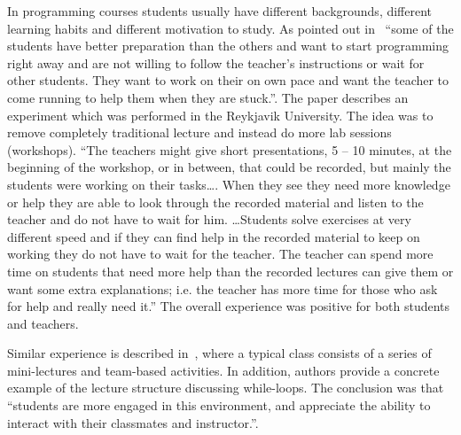 \documentclass{article}
\begin{document}
In programming courses students usually have different backgrounds,
different learning habits and different motivation to study. As
pointed out in~\cite{experiment_iceland_2006} ``some of the students
have better preparation than the others and want to start programming
right away and are not willing to follow the teacher’s instructions or
wait for other students. They want to work on their on own pace and
want the teacher to come running to help them when they are stuck.''.
The paper describes an experiment which was performed in the Reykjavik
University. The idea was to remove completely traditional lecture and
instead do more lab sessions (workshops). ``The teachers might give
short presentations, 5 – 10 minutes, at the beginning of the workshop,
or in between, that could be recorded, but mainly the students were
working on their tasks\ldots. When they see they need more knowledge
or help they are able to look through the recorded material and listen to the
teacher and do not have to wait for him. \ldots Students solve
exercises at very different speed and if they can find help in the
recorded material to keep on working they do not have to wait for the
teacher. The teacher can spend more time on students that need more
help than the recorded lectures can give them or want some extra
explanations; i.e. the teacher has more time for those who ask for
help and really need it.'' The overall experience was positive for
both students and teachers.

Similar experience is described in~\cite{cordes2002active}, where a
typical class consists of a series of mini-lectures and team-based
activities.  In addition, authors provide a concrete example of the
lecture structure discussing while-loops. The conclusion was that
``students are more engaged in this environment, and appreciate the
ability to interact with their classmates and instructor.''.
\end{document}
